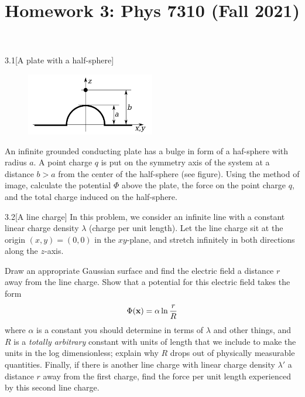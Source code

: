 \documentclass[12pt]{article}
\title{Homework 3: Phys 7310 (Fall 2021)}
\begin{document}
\maketitle

\begin{problem}{3.1}[A plate with a half-sphere]~\\
    \begin{figure}[h]
        \centering
        \includegraphics[width=0.5\textwidth]{hw3_p1.jpg}
    \end{figure}
An infinite grounded conducting plate has a bulge in form of a haf-sphere with
radius $a$. A point charge $q$ is put on the symmetry axis of the system at a
distance $b>a$ from the center of the half-sphere (see figure). Using the method
of image, calculate the potential $\Phi$ above the plate, the force on the point
charge $q$, and the total charge induced on the half-sphere.
\end{problem}
\begin{problem}{3.2}[A line charge]
In this problem, we consider an infinite line with a constant linear charge
density $\lambda$ (charge per unit length). Let the line charge sit at the
origin $(x,y)=(0,0)$ in the $xy$-plane, and stretch infinitely in both
directions along the $z$-axis.

Draw an appropriate Gaussian surface and find the electric field a distance $r$
away from the line charge. Show that a potential for this electric field takes
the form
\begin{equation}
    \Phi(\vb{x})=\alpha\ln\frac{r}{R} 
\end{equation}
where $\alpha$ is a constant you should determine in terms of $\lambda$ and
other things, and $R$ is a \textit{totally arbitrary} constant with units of
length that we include to make the units in the log dimensionless; explain why
$R$ drops out of physically measurable quantities. Finally, if there is another
line charge with linear charge density $\lambda'$ a distance $r$ away from the
first charge, find the force per unit length experienced by this second line
charge.
\end{problem}
\end{document}

